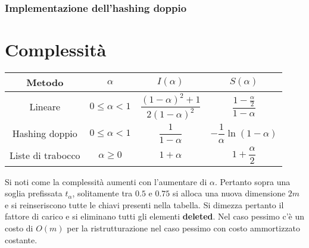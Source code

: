 \subsubsection{Implementazione dell'hashing doppio}

\section{Complessit\`a}
\begin{center}
\begin{tabular}{|c|c|c|c|}
\hline
\textbf{Metodo} & $\alpha$ & $I(\alpha)$ & $S(\alpha)$\\
\hline
Lineare & $0\le\alpha< 1$ & $\dfrac{(1-\alpha)^2+1}{2(1-\alpha)^2}$ & $\dfrac{1-\frac{\alpha}{2}}{1-\alpha}$\\
\hline
Hashing doppio & $0\le\alpha< 1$ & $\dfrac{1}{1-\alpha}$ & $-\dfrac{1}{\alpha}\ln(1-\alpha)$\\
\hline
Liste di trabocco & $\alpha\ge 0$ & $1+\alpha$ & $1+\dfrac{\alpha}{2}$\\
\hline
\end{tabular}
\end{center}
Si noti come la complessit\`a aumenti con l'aumentare di $\alpha$. Pertanto sopra una soglia prefissata $t_\alpha$, solitamente tra $0.5$ e $0.75$ si alloca
una nuova dimensione $2m$ e si reinseriscono tutte le chiavi presenti nella tabella. Si dimezza pertanto il fattore di carico e si eliminano tutti gli 
elementi \textbf{deleted}. Nel caso pessimo c'\`e un costo di $O(m)$ per la ristrutturazione nel caso pessimo con costo ammortizzato costante. 
